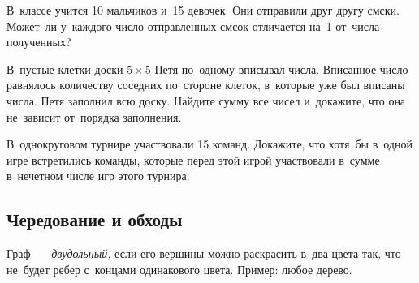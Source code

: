 \begin{problems}

\item
В~классе учится 10 мальчиков и~15 девочек.
Они отправили друг другу смски.
Может~ли у~каждого число отправленных смсок отличается на~1 от~числа
полученных?

\item
В~пустые клетки доски $5 \times 5$ Петя по~одному вписывал числа.
Вписанное число равнялось количеству соседних по~стороне клеток, в~которые уже
был вписаны числа.
Петя заполнил всю доску.
Найдите сумму все чисел и~докажите, что она не~зависит от~порядка заполнения.

\item
В~однокруговом турнире участвовали 15 команд.
Докажите, что хотя~бы в~одной игре встретились команды, которые перед этой
игрой участвовали в~сумме в~нечетном числе игр этого турнира.

\end{problems}

\subsection*{Чередование и обходы}

Граф~--- \emph{двудольный,} если его вершины можно раскрасить в~два цвета так,
что не~будет ребер с~концами одинакового цвета.
Пример: любое дерево.

